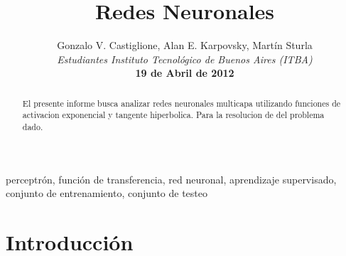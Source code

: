 \documentclass[%
    final,
    reprint,
    notitlepage,
    narroweqnarray,
    inline,
    twoside,
    invited
    ]{ieee}
\begin{document}
\title[Redes Neuronales]{%
       Redes Neuronales}

\author[Castiglione, Karpovsky, Sturla]{Gonzalo V. Castiglione, Alan E. Karpovsky, Martín Sturla\\\textit{Estudiantes 
       Instituto Tecnológico de Buenos Aires (ITBA)}\\
\textbf{19 de Abril de 2012}
}


\lognumber{}
\pubitemident{}


\maketitle               

\begin{abstract} 
El presente informe busca analizar redes neuronales multicapa utilizando funciones de activacion exponencial y tangente hiperbolica. 
Para la resolucion de del problema dado.

\end{abstract}

\begin{keywords}
perceptrón, función de transferencia, red neuronal, aprendizaje supervisado, conjunto de entrenamiento, conjunto de testeo
\end{keywords}

\section{Introducción}
\end{document}
